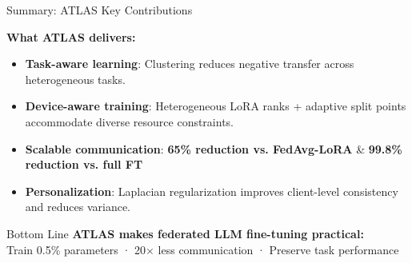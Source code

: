 \documentclass[aspectratio=169]{beamer}
\newcommand{\hl}[1]{\textcolor{cnamred}{\textbf{#1}}}
\begin{document}
\begin{frame}{Summary: ATLAS Key Contributions}

\textbf{What ATLAS delivers:}

\vspace{0.5cm}

\begin{itemize}
  \item \hl{Task-aware learning}: Clustering reduces negative transfer across heterogeneous tasks.
  
  \item \hl{Device-aware training}: Heterogeneous LoRA ranks + adaptive split points accommodate diverse resource constraints.
 \item \hl{Scalable communication}: 
\textbf{65\% reduction vs. FedAvg-LoRA} \& \textbf{99.8\% reduction vs. full FT} 
  \item \hl{Personalization}: Laplacian regularization improves client-level consistency and reduces variance.
\end{itemize}

\vspace{0.5cm}

\begin{block}{Bottom Line}
\centering
\textbf{ATLAS makes federated LLM fine-tuning practical:} \\
Train 0.5\% parameters · 20$\times$ less communication · Preserve task performance
\end{block}

\end{frame}
\end{document}
